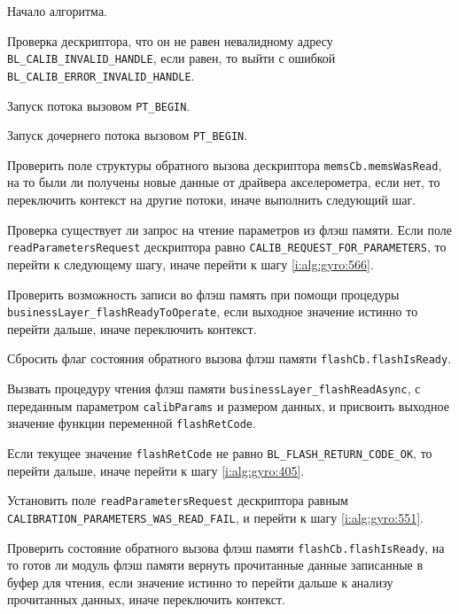 \begin{enumerate_step}
    \item Начало алгоритма.
    \item Проверка дескриптора, что он не равен невалидному адресу \lstinline|BL_CALIB_INVALID_HANDLE|, если равен, то выйти с ошибкой
    \lstinline|BL_CALIB_ERROR_INVALID_HANDLE|.
    \item Запуск потока вызовом \lstinline|PT_BEGIN|.
    \item Запуск дочернего потока вызовом \lstinline|PT_BEGIN|.
    \item \label{i:alg:gyro:551} Проверить поле структуры обратного вызова дескриптора \lstinline|memsCb.memsWasRead|, на то были ли получены новые данные от драйвера акселерометра, 
    если нет, то переключить контекст на другие потоки, иначе выполнить следующий шаг.
    \item \label{i:alg:gyro:557} Проверка существует ли запрос на чтение параметров из флэш памяти. Если поле \lstinline|readParametersRequest| дескриптора равно \lstinline|CALIB_REQUEST_FOR_PARAMETERS|,
    то перейти к следующему шагу, иначе перейти к шагу \ref{i:alg:gyro:566}.
    \item Проверить возможность записи во флэш память при помощи процедуры \lstinline|businessLayer_flashReadyToOperate|, если выходное значение истинно то перейти дальше, иначе переключить контекст.
    \item Сбросить флаг состояния обратного вызова флэш памяти \lstinline|flashCb.flashIsReady|.
    \item Вызвать процедуру чтения флэш памяти \lstinline|businessLayer_flashReadAsync|, с переданным параметром \lstinline|calibParams| и размером данных, и присвоить выходное значение функции переменной \lstinline|flashRetCode|.
    \item Если текущее значение \lstinline|flashRetCode| не равно \lstinline|BL_FLASH_RETURN_CODE_OK|, то перейти дальше, иначе перейти к шагу
    \ref{i:alg:gyro:405}.
    \item Установить поле \lstinline|readParametersRequest| дескриптора равным \lstinline|CALIBRATION_PARAMETERS_WAS_READ_FAIL|, и перейти к шагу \ref{i:alg:gyro:551}.
    \item \label{i:alg:gyro:405}  Проверить состояние обратного вызова флэш памяти \lstinline|flashCb.flashIsReady|, на то готов ли модуль флэш памяти вернуть
    прочитанные данные записанные в буфер для чтения, если значение
    истинно то перейти дальше к анализу прочитанных данных, иначе
    переключить контекст.

\end{enumerate_step}
